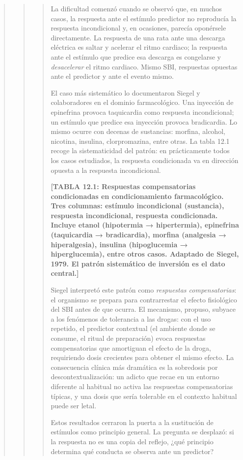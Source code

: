 \documentclass[
  letterpaper,
  DIV=11,
  numbers=noendperiod]{scrreprt}
\begin{document}
\begin{tcolorbox}[enhanced jigsaw, toprule=.15mm, arc=.35mm, colback=white, opacityback=0, colframe=quarto-callout-note-color-frame, breakable, rightrule=.15mm, left=2mm, leftrule=.75mm, bottomrule=.15mm]
\begin{quote}
\begin{quote}
\begin{quote}
La dificultad comenzó cuando se observó que, en muchos casos, la
respuesta ante el estímulo predictor no reproducía la respuesta
incondicional y, en ocasiones, parecía oponérsele directamente. La
respuesta de una rata ante una descarga eléctrica es saltar y acelerar
el ritmo cardiaco; la respuesta ante el estímulo que predice esa
descarga es congelarse y \emph{desacelerar} el ritmo cardiaco. Mismo
SBI, respuestas opuestas ante el predictor y ante el evento mismo.

El caso más sistemático lo documentaron Siegel y colaboradores en el
dominio farmacológico. Una inyección de epinefrina provoca taquicardia
como respuesta incondicional; un estímulo que predice esa inyección
provoca bradicardia. Lo mismo ocurre con decenas de sustancias: morfina,
alcohol, nicotina, insulina, clorpromazina, entre otras. La tabla 12.1
recoge la sistematicidad del patrón: en prácticamente todos los casos
estudiados, la respuesta condicionada va en dirección opuesta a la
respuesta incondicional.

\textbf{{[}TABLA 12.1: Respuestas compensatorias condicionadas en
condicionamiento farmacológico. Tres columnas: estímulo incondicional
(sustancia), respuesta incondicional, respuesta condicionada. Incluye
etanol (hipotermia → hipertermia), epinefrina (taquicardia →
bradicardia), morfina (analgesia → hiperalgesia), insulina (hipoglucemia
→ hiperglucemia), entre otros casos. Adaptado de Siegel, 1979. El patrón
sistemático de inversión es el dato central.{]}}

Siegel interpretó este patrón como \emph{respuestas compensatorias}: el
organismo se prepara para contrarrestar el efecto fisiológico del SBI
antes de que ocurra. El mecanismo, propuso, subyace a los fenómenos de
tolerancia a las drogas: con el uso repetido, el predictor contextual
(el ambiente donde se consume, el ritual de preparación) evoca
respuestas compensatorias que amortiguan el efecto de la droga,
requiriendo dosis crecientes para obtener el mismo efecto. La
consecuencia clínica más dramática es la sobredosis por
descontextualización: un adicto que recae en un entorno diferente al
habitual no activa las respuestas compensatorias típicas, y una dosis
que sería tolerable en el contexto habitual puede ser letal.

Estos resultados cerraron la puerta a la sustitución de estímulos como
principio general. La pregunta se desplazó: si la respuesta no es una
copia del reflejo, ¿qué principio determina qué conducta se observa ante
un predictor?


\end{quote}
\end{quote}
\end{quote}
\end{tcolorbox}
\end{document}
